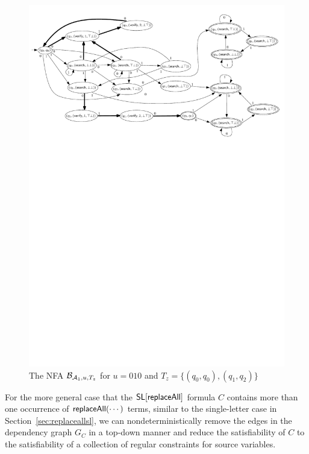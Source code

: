 \begin{example}
\begin{figure}[htbp]
\begin{center}
\includegraphics[scale=0.68]{constant-string-example-2.pdf}
\end{center}
\caption{The NFA $\mathcal{B}_{\mathcal{A}_1, u, T_z}$ for $u = 010$ and $T_z= \{(q_0,q_0),(q_1,q_2)\}$}\label{fig-cs-exmp-2}
\end{figure}
\end{example}

For the more general case that the $\mathsf{SL}[\mathsf{replaceAll}]$ formula $C$ contains more than one occurrence of $\mathsf{replaceAll}(\cdots)$ terms, similar to the single-letter case in Section~\ref{sec:replaceallsl}, we can nondeterministically remove the edges in the dependency graph $G_C$ in a top-down manner and reduce the satisfiability of $C$ to the satisfiability of a collection of regular constraints for source variables.

